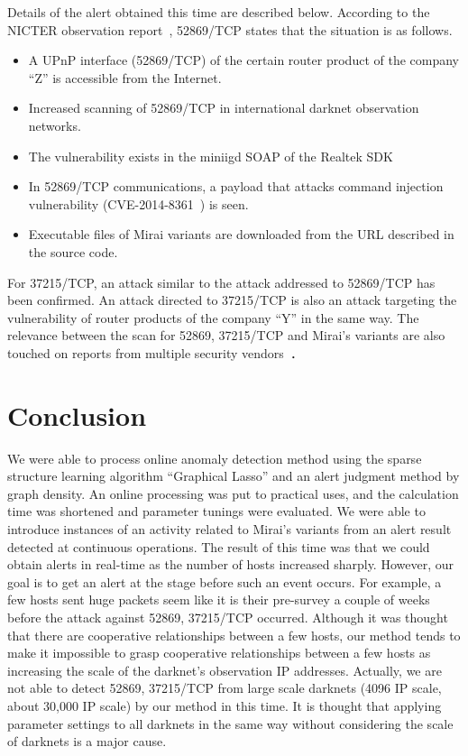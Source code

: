 \documentclass{sig-alternate-10pt}
\begin{document}
Details of the alert obtained this time are described below.
According to the NICTER observation report~\cite{NICTER}, 52869/TCP states that the situation is as follows.
\begin{itemize}
	\item  A UPnP interface (52869/TCP) of the certain router product of the company ``Z'' is accessible from the Internet.
	\item Increased scanning of 52869/TCP in international darknet observation networks.
	\item The vulnerability exists in the miniigd SOAP of the Realtek SDK~\cite{Zeroday}
	\item In 52869/TCP communications, a payload that attacks command injection vulnerability (CVE-2014-8361~\cite{CVE}) is seen.
	\item Executable files of Mirai variants are downloaded from the URL described in the source code.
\end{itemize}
For 37215/TCP, an attack similar to the attack addressed to 52869/TCP has been confirmed.
An attack directed to 37215/TCP is also an attack targeting the vulnerability of router products of the company ``Y'' in the same way.
The relevance between the scan for 52869, 37215/TCP and Mirai's variants are also touched on reports from multiple security vendors~\cite{Rise,Warning}．

\section{Conclusion}
We were able to process online anomaly detection method using the sparse structure learning algorithm ``Graphical Lasso'' and an alert judgment method by graph density.
An online processing was put to practical uses, and the calculation time was shortened and parameter tunings were evaluated.
We were able to introduce instances of an activity related to Mirai's variants from an alert result detected at continuous operations.
The result of this time was that we could obtain alerts in real-time as the number of hosts increased sharply.
However, our goal is to get an alert at the stage before such an event occurs.
For example, a few hosts sent huge packets seem like it is their pre-survey a couple of weeks before the attack against 52869, 37215/TCP occurred.
Although it was thought that there are cooperative relationships between a few hosts, our method tends to make it impossible to grasp cooperative relationships between a few hosts as increasing the scale of the darknet's observation IP addresses.
Actually, we are not able to detect 52869, 37215/TCP from large scale darknets (4096 IP scale, about 30,000 IP scale) by our method in this time.
It is thought that applying parameter settings to all darknets in the same way without considering the scale of darknets is a major cause.
\end{document}
